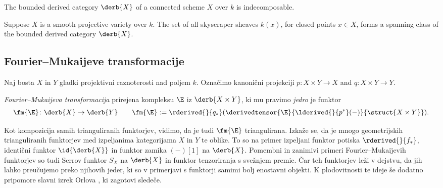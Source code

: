 \newpage

\begin{theorem}
    \label{Db(X) indecomposable for X connected}
    The bounded derived category $\derb{X}$ of a connected scheme $X$ over $k$ is indecomposable.
\end{theorem}

\begin{proposition}
    \label{k(x) spanning class}
    Suppose $X$ is a smooth projective variety over $k$. The set of all skyscraper sheaves $k(x)$, for closed points $x \in X$, forms a spanning class of the bounded derived category $\derb{X}$.
\end{proposition}

\subsection*{Fourier--Mukaijeve transformacije}

Naj bosta $X$ in $Y$ gladki projektivni raznoterosti nad poljem $k$. Označimo kanonični projekciji $p \colon X \times Y \to X$ and $q \colon X \times Y \to Y$. 

\begin{definicija}
    \emph{Fourier--Mukaijeva transformacija} prirejena kompleksu $\E$ iz $\derb{X \times Y}$, ki mu pravimo \emph{jedro} je funktor
    \[
        \fm{\E} \colon \derb{X} \to \derb{Y} \qquad \fm{\E} := \rderived{}{q_*}(\derivedtensor{\E}{\lderived{}{p^*}(-)}{\struct{X \times Y}}).
    \]
\end{definicija}

Kot kompozicija samih trianguliranih funktorjev, vidimo, da je tudi $\fm{\E}$ triangulirana. Izkaže se, da je mnogo geometrijskih trianguliranih funktorjev med izpeljanima kategorijama $X$ in $Y$ te oblike. To so na primer izpeljani funktor potiska $\rderived{}{f_*}$, identični funktor $\id{\derb{X}}$ in funktor zamika $(-)[1]$ na $\derb{X}$. Pomembni in zanimivi primeri Fourier--Mukaijevih funktorjev so tudi Serrov funktor $S_X$ na $\derb{X}$ in funktor tenzoriranja s svežnjem premic. Čar teh funktorjev leži v dejstvu, da jih lahko preučujemo preko njihovih jeder, ki so v primerjavi s funktorji samimi bolj enostavni objekti. K plodovitnosti te ideje še dodatno pripomore slavni izrek Orlova \cite{Orlov2003}, ki zagotovi sledeče.

